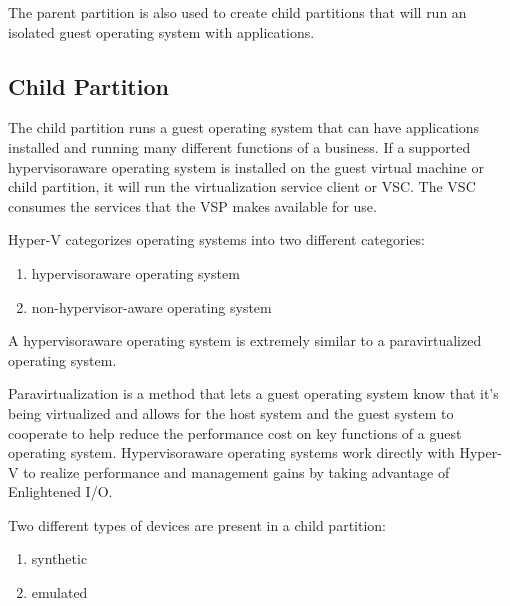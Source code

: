 \vspace{5mm}

The parent partition is also used to create child partitions that will run an isolated guest operating system with applications.

\vspace{5mm}
\subsection{Child Partition}
\vspace{5mm}

The child partition \cite{BOOK:1} runs a guest operating system that can have applications installed and running many different functions of a business. If a supported hypervisoraware operating system is installed on the guest virtual machine or child partition, it will run the virtualization service client or VSC. The VSC consumes the services that the VSP makes available for use.

\vspace{5mm}

Hyper-V categorizes operating systems into two different categories:
\vspace{5mm}
\begin{enumerate}
	\item hypervisoraware operating system 
	\item non-hypervisor-aware operating system
\end{enumerate}

\vspace{5mm}

A hypervisoraware operating system is extremely similar to a paravirtualized operating system.

\vspace{5mm}

Paravirtualization is a method that lets a guest operating system know that it’s being virtualized and allows for the host system and the guest system to cooperate to help
reduce the performance cost on key functions of a guest operating system. Hypervisoraware operating systems work directly with Hyper-V to realize performance and management gains by taking advantage of Enlightened I/O.

\vspace{5mm}

Two different types of devices are present in a child partition:
\vspace{5mm}
\begin{enumerate}
	\item synthetic
	\item emulated
\end{enumerate}


